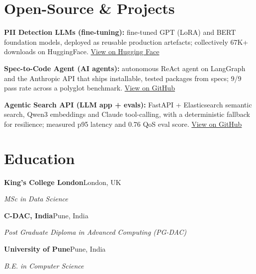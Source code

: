 \documentclass[10pt,a4paper]{article}
\begin{document}
\section{Open-Source \& Projects}
\begin{tight}
  \item \textbf{PII Detection LLMs (fine-tuning):} fine-tuned GPT (LoRA) and BERT foundation models, deployed as reusable production artefacts; collectively 67K+ downloads on HuggingFace. \href{https://huggingface.co/ab-ai/pii_model}{View on Hugging Face}
  \item \textbf{Spec-to-Code Agent (AI agents):} autonomous ReAct agent on LangGraph and the Anthropic API that ships installable, tested packages from specs; 9/9 pass rate across a polyglot benchmark. \href{https://github.com/abhijeetscode/Spec-to-Code-Agent}{View on GitHub}
  \item \textbf{Agentic Search API (LLM app + evals):} FastAPI + Elasticsearch semantic search, Qwen3 embeddings and Claude tool-calling, with a deterministic fallback for resilience; measured p95 latency and 0.76 QoS eval score. \href{https://github.com/abhijeetscode/search-agent}{View on GitHub}
\end{tight}

\section{Education}
{\color{company}\bfseries King's College London}\hfill {\color{muted}London, UK}\par
{\itshape MSc in Data Science}\par\vspace{2pt}
{\color{company}\bfseries C-DAC, India}\hfill {\color{muted}Pune, India}\par
{\itshape Post Graduate Diploma in Advanced Computing (PG-DAC)}\par\vspace{2pt}
{\color{company}\bfseries University of Pune}\hfill {\color{muted}Pune, India}\par
{\itshape B.E. in Computer Science}\par
\end{document}
